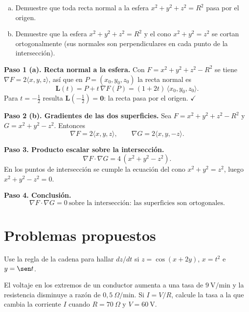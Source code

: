 \begin{prob}
\begin{enumerate}[a)]
  \item Demuestre que toda recta normal a la esfera $x^2+y^2+z^2=R^2$ pasa por
        el origen.
  \item Demuestre que la esfera $x^2+y^2+z^2=R^2$ y el cono $x^2+y^2=z^2$ se
        cortan ortogonalmente (sus normales son perpendiculares en cada punto
        de la intersección).
\end{enumerate}
\begin{myproof}
\textbf{Paso 1 (a). Recta normal a la esfera.}
Con $F=x^2+y^2+z^2-R^2$ se tiene $\nabla F=2\langle x,y,z\rangle$, así que en
$P=(x_0,y_0,z_0)$ la recta normal es
\[
  \mathbf{L}(t)=P+t\,\nabla F(P)=(1+2t)\,\langle x_0,y_0,z_0\rangle.
\]
Para $t=-\tfrac12$ resulta $\mathbf L(-\tfrac12)=\mathbf 0$: la recta pasa por
el origen. $\checkmark$

\textbf{Paso 2 (b). Gradientes de las dos superficies.}
Sea $F=x^2+y^2+z^2-R^2$ y $G=x^2+y^2-z^2$. Entonces
\[
  \nabla F=2\langle x,y,z\rangle,\qquad \nabla G=2\langle x,y,-z\rangle.
\]

\textbf{Paso 3. Producto escalar sobre la intersección.}
\[
  \nabla F\cdot\nabla G=4\,(x^2+y^2-z^2).
\]
En los puntos de intersección se cumple la ecuación del cono $x^2+y^2=z^2$,
luego $x^2+y^2-z^2=0$.

\textbf{Paso 4. Conclusión.}
\[
  \boxed{\ \nabla F\cdot\nabla G=0\ \text{sobre la intersección: las
  superficies son ortogonales.}\ }
\]
\end{myproof}
\end{prob}



\section{Problemas propuestos}
\begin{prob}
Use la regla de la cadena para hallar $dz/dt$ si $z = \cos(x + 2y)$, $x = t^2$ e $y = \sen t$.
\end{prob}

\begin{prob}
El voltaje en los extremos de un conductor aumenta a una tasa de $9\ \text{V/min}$ y la resistencia disminuye a razón de $0{,}5\ \Omega/\text{min}$. Si $I=V/R$, calcule la tasa a la que cambia la corriente $I$ cuando $R=70\ \Omega$ y $V=60\ \text{V}$.
\end{prob}

